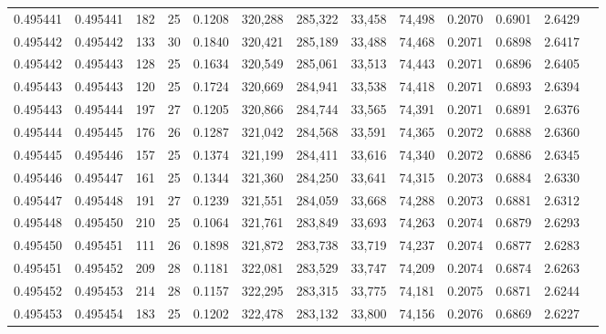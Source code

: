 \begin{tabular}{rrrrrrrrrrrrr}
0.495441 & 0.495441 & 182 &  25 &                                     0.1208 & 320,288 & 285,322 &  33,458 &  74,498 & 0.2070 & 0.6901 & 2.6429 \\
0.495442 & 0.495442 & 133 &  30 &                                     0.1840 & 320,421 & 285,189 &  33,488 &  74,468 & 0.2071 & 0.6898 & 2.6417 \\
0.495442 & 0.495443 & 128 &  25 &                                     0.1634 & 320,549 & 285,061 &  33,513 &  74,443 & 0.2071 & 0.6896 & 2.6405 \\
0.495443 & 0.495443 & 120 &  25 &                                     0.1724 & 320,669 & 284,941 &  33,538 &  74,418 & 0.2071 & 0.6893 & 2.6394 \\
0.495443 & 0.495444 & 197 &  27 &                                     0.1205 & 320,866 & 284,744 &  33,565 &  74,391 & 0.2071 & 0.6891 & 2.6376 \\
0.495444 & 0.495445 & 176 &  26 &                                     0.1287 & 321,042 & 284,568 &  33,591 &  74,365 & 0.2072 & 0.6888 & 2.6360 \\
0.495445 & 0.495446 & 157 &  25 &                                     0.1374 & 321,199 & 284,411 &  33,616 &  74,340 & 0.2072 & 0.6886 & 2.6345 \\
0.495446 & 0.495447 & 161 &  25 &                                     0.1344 & 321,360 & 284,250 &  33,641 &  74,315 & 0.2073 & 0.6884 & 2.6330 \\
0.495447 & 0.495448 & 191 &  27 &                                     0.1239 & 321,551 & 284,059 &  33,668 &  74,288 & 0.2073 & 0.6881 & 2.6312 \\
0.495448 & 0.495450 & 210 &  25 &                                     0.1064 & 321,761 & 283,849 &  33,693 &  74,263 & 0.2074 & 0.6879 & 2.6293 \\
0.495450 & 0.495451 & 111 &  26 &                                     0.1898 & 321,872 & 283,738 &  33,719 &  74,237 & 0.2074 & 0.6877 & 2.6283 \\
0.495451 & 0.495452 & 209 &  28 &                                     0.1181 & 322,081 & 283,529 &  33,747 &  74,209 & 0.2074 & 0.6874 & 2.6263 \\
0.495452 & 0.495453 & 214 &  28 &                                     0.1157 & 322,295 & 283,315 &  33,775 &  74,181 & 0.2075 & 0.6871 & 2.6244 \\
0.495453 & 0.495454 & 183 &  25 &                                     0.1202 & 322,478 & 283,132 &  33,800 &  74,156 & 0.2076 & 0.6869 & 2.6227 \\

\end{tabular}
